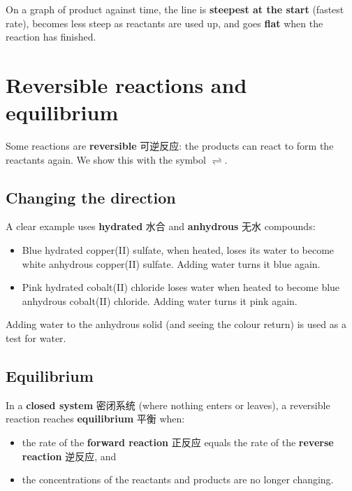 \documentclass[11pt]{article}
\begin{document}
On a graph of product against time, the line is \textbf{steepest at the start} (fastest rate), becomes less steep as reactants are used up, and goes \textbf{flat} when the reaction has finished.

\section*{Reversible reactions and equilibrium}

Some reactions are \textbf{reversible} 可逆反应: the products can react to form the reactants again. We show this with the symbol $\rightleftharpoons$.

\subsection*{Changing the direction}

A clear example uses \textbf{hydrated} 水合 and \textbf{anhydrous} 无水 compounds:

\begin{itemize}
\item Blue hydrated copper(II) sulfate, when heated, loses its water to become white anhydrous copper(II) sulfate. Adding water turns it blue again.

\item Pink hydrated cobalt(II) chloride loses water when heated to become blue anhydrous cobalt(II) chloride. Adding water turns it pink again.

\end{itemize}

Adding water to the anhydrous solid (and seeing the colour return) is used as a test for water.

\subsection*{Equilibrium}

In a \textbf{closed system} 密闭系统 (where nothing enters or leaves), a reversible reaction reaches \textbf{equilibrium} 平衡 when:

\begin{itemize}
\item the rate of the \textbf{forward reaction} 正反应 equals the rate of the \textbf{reverse reaction} 逆反应, and

\item the concentrations of the reactants and products are no longer changing.

\end{itemize}
\end{document}
